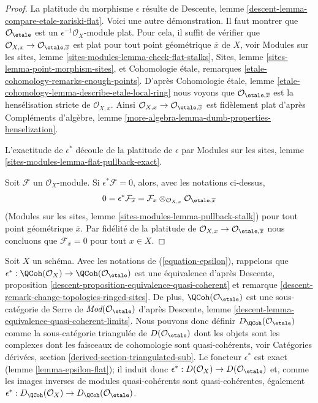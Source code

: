 \begin{proof}
La platitude du morphisme $\epsilon$ résulte de
Descente, lemme \ref{descent-lemma-compare-etale-zariski-flat}.
Voici une autre démonstration. Il faut montrer que
$\mathcal{O}_\etale$ est un $\epsilon^{-1}\mathcal{O}_X$-module plat.
Pour cela, il suffit de vérifier que
$\mathcal{O}_{X, x} \to \mathcal{O}_{\etale, \overline{x}}$
est plat pour tout point géométrique $\overline{x}$ de $X$, voir
Modules sur les sites, lemme
\ref{sites-modules-lemma-check-flat-stalks},
Sites, lemme
\ref{sites-lemma-point-morphism-sites},
et
Cohomologie étale, remarques
\ref{etale-cohomology-remarks-enough-points}.
D'après Cohomologie étale, lemme
\ref{etale-cohomology-lemma-describe-etale-local-ring}
nous voyons que $\mathcal{O}_{\etale, \overline{x}}$ est la
hensélisation stricte de $\mathcal{O}_{X, x}$. Ainsi
$\mathcal{O}_{X, x} \to \mathcal{O}_{\etale, \overline{x}}$
est fidèlement plat d'après Compléments d'algèbre,
lemme \ref{more-algebra-lemma-dumb-properties-henselization}.

\medskip\noindent
L'exactitude de $\epsilon^*$ découle de la platitude
de $\epsilon$ par
Modules sur les sites, lemme \ref{sites-modules-lemma-flat-pullback-exact}.

\medskip\noindent
Soit $\mathcal{F}$ un $\mathcal{O}_X$-module. Si
$\epsilon^*\mathcal{F} = 0$, alors, avec les notations ci-dessus,
$$
0 = \epsilon^*\mathcal{F}_{\overline{x}} =
\mathcal{F}_x \otimes_{\mathcal{O}_{X, x}} \mathcal{O}_{\etale, \overline{x}}
$$
(Modules sur les sites, lemme \ref{sites-modules-lemma-pullback-stalk})
pour tout point géométrique $\overline{x}$. Par fidélité de la platitude de
$\mathcal{O}_{X, x} \to \mathcal{O}_{\etale, \overline{x}}$
nous concluons que $\mathcal{F}_x = 0$ pour tout $x \in X$.
\end{proof}

\noindent
Soit $X$ un schéma. Avec les notations de (\ref{equation-epsilon}),
rappelons que $\epsilon^* : \QCoh(\mathcal{O}_X)
\to \QCoh(\mathcal{O}_\etale)$
est une équivalence d'après
Descente, proposition \ref{descent-proposition-equivalence-quasi-coherent} et
remarque \ref{descent-remark-change-topologies-ringed-sites}.
De plus, $\QCoh(\mathcal{O}_\etale)$ est une
sous-catégorie de Serre de
$\textit{Mod}(\mathcal{O}_\etale)$ d'après
Descente, lemme \ref{descent-lemma-equivalence-quasi-coherent-limits}.
Nous pouvons donc définir $D_\QCoh(\mathcal{O}_\etale)$ comme la sous-catégorie triangulée
de $D(\mathcal{O}_\etale)$ dont les objets sont les
complexes dont les faisceaux de cohomologie sont quasi-cohérents, voir
Catégories dérivées, section \ref{derived-section-triangulated-sub}.
Le foncteur $\epsilon^*$ est exact (lemme \ref{lemma-epsilon-flat});
il induit donc
$\epsilon^* :  D(\mathcal{O}_X) \to D(\mathcal{O}_\etale)$
et, comme les images inverses de modules quasi-cohérents sont quasi-cohérentes,
également $\epsilon^* : D_\QCoh(\mathcal{O}_X) \to
D_\QCoh(\mathcal{O}_\etale)$.

